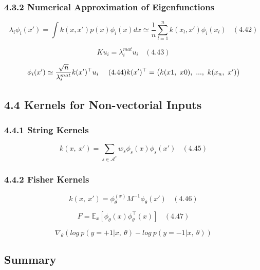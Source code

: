 \documentclass[
]{article}
\begin{document}
\hypertarget{numerical-approximation-of-eigenfunctions}{%
\subsubsection{4.3.2 Numerical Approximation of
Eigenfunctions}\label{numerical-approximation-of-eigenfunctions}}

\[
\lambda_i\phi_i(x') = \int k(x, x')p(x)\phi_i(x) dx 
\simeq \frac 1 n \sum^n_{l=1} 
k(x_l, x')\phi_i(x_l)
\ \ \ \ (4.42)
\]

\[
Ku_i = \lambda^{mat}_i u_i
\ \ \ \ (4.43)
\]

\[
\phi_i(x') \simeq \frac {\sqrt {n}} {\lambda_i^{mat}} k(x')^{\top}u_i
\ \ \ \ (4.44)\\
k(x')^{\top} = \big(k(x1,\ x0),\ ... ,\ k(x_n,\ x')\big)
\]

\hypertarget{kernels-for-non-vectorial-inputs}{%
\subsection{4.4 Kernels for Non-vectorial
Inputs}\label{kernels-for-non-vectorial-inputs}}

\hypertarget{string-kernels}{%
\subsubsection{4.4.1 String Kernels}\label{string-kernels}}

\[
k(x,\ x') = \sum_{s \in \mathcal A^{*}} w_s \phi_s(x) \phi_s(x')
\ \ \ \ (4.45)
\]

\hypertarget{fisher-kernels}{%
\subsubsection{4.4.2 Fisher Kernels}\label{fisher-kernels}}

\[
k(x,\ x') = \phi_\theta ^{(x)} M^{-1}\phi_{\theta}(x')
\ \ \ \ (4.46)
\]

\[
F = \mathbb E_x[\phi_\theta(x)\phi_{\theta}^{\top} (x)]
\ \ \ \ (4.47)
\]

\[
\nabla_\theta (log\ p(y = +1|x,\ \theta)-log\ p(y = -1|x,\ \theta))
\]

\hypertarget{summary}{%
\subsection{Summary}\label{summary}}
\end{document}
